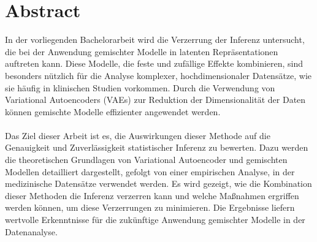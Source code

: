 \documentclass[%
thesis=student,%
coverpage=false,%
titlepage=false,%
headmarks=true, %
german,%
font=libertine, %
math=newpxtx, %
BCOR=5mm,%
coverBCOR=11mm%
]{tumbook}
\theoremstyle{break}
\begin{document}
\cleardoublepage{}

\tableofcontents

\cleardoublepage{}
\mainmatter{}
\section{Abstract}
In der vorliegenden Bachelorarbeit wird die Verzerrung der Inferenz untersucht, die bei der Anwendung gemischter Modelle in latenten Repräsentationen auftreten kann. Diese Modelle, die feste und zufällige Effekte kombinieren, sind besonders nützlich für die Analyse komplexer, hochdimensionaler Datensätze, wie sie häufig in klinischen Studien vorkommen. Durch die Verwendung von Variational Autoencoders (VAEs) zur Reduktion der Dimensionalität der Daten können gemischte Modelle effizienter angewendet werden.\\
\\
Das Ziel dieser Arbeit ist es, die Auswirkungen dieser Methode auf die Genauigkeit und Zuverlässigkeit statistischer Inferenz zu bewerten. Dazu werden die theoretischen Grundlagen von Variational Autoencoder und gemischten Modellen detailliert dargestellt, gefolgt von einer empirischen Analyse, in der medizinische Datensätze verwendet werden. Es wird gezeigt, wie die Kombination dieser Methoden die Inferenz verzerren kann und welche Maßnahmen ergriffen werden können, um diese Verzerrungen zu minimieren. Die Ergebnisse liefern wertvolle Erkenntnisse für die zukünftige Anwendung gemischter Modelle in der Datenanalyse.

\end{document}
